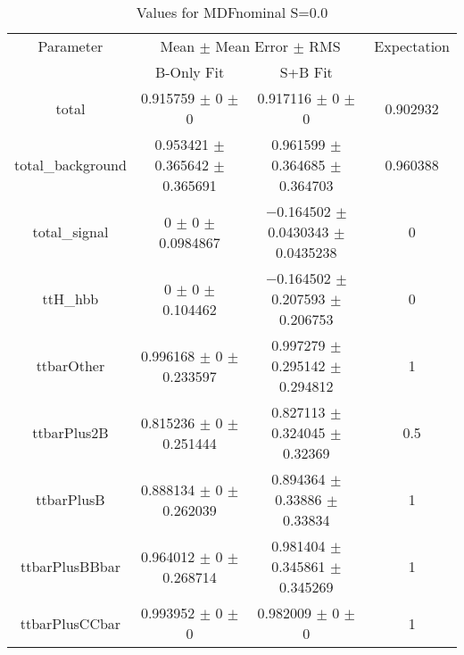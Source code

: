 \begin{table}
\centering
\caption{Values for MDFnominal S=0.0}
\begin{tabular}{cccc}
\toprule
Parameter & \multicolumn{2}{c}{Mean $\pm$ Mean Error $\pm$ RMS} & Expectation\\
 & B-Only Fit & S+B Fit & \\
\midrule
total & \num{0.915759} $\pm$ \num{0} $\pm$ \num{0} & \num{0.917116} $\pm$ \num{0} $\pm$ \num{0} & \num{0.902932}\\
total\_background & \num{0.953421} $\pm$ \num{0.365642} $\pm$ \num{0.365691} & \num{0.961599} $\pm$ \num{0.364685} $\pm$ \num{0.364703} & \num{0.960388}\\
total\_signal & \num{0} $\pm$ \num{0} $\pm$ \num{0.0984867} & \num{-0.164502} $\pm$ \num{0.0430343} $\pm$ \num{0.0435238} & \num{0}\\
ttH\_hbb & \num{0} $\pm$ \num{0} $\pm$ \num{0.104462} & \num{-0.164502} $\pm$ \num{0.207593} $\pm$ \num{0.206753} & \num{0}\\
ttbarOther & \num{0.996168} $\pm$ \num{0} $\pm$ \num{0.233597} & \num{0.997279} $\pm$ \num{0.295142} $\pm$ \num{0.294812} & \num{1}\\
ttbarPlus2B & \num{0.815236} $\pm$ \num{0} $\pm$ \num{0.251444} & \num{0.827113} $\pm$ \num{0.324045} $\pm$ \num{0.32369} & \num{0.5}\\
ttbarPlusB & \num{0.888134} $\pm$ \num{0} $\pm$ \num{0.262039} & \num{0.894364} $\pm$ \num{0.33886} $\pm$ \num{0.33834} & \num{1}\\
ttbarPlusBBbar & \num{0.964012} $\pm$ \num{0} $\pm$ \num{0.268714} & \num{0.981404} $\pm$ \num{0.345861} $\pm$ \num{0.345269} & \num{1}\\
ttbarPlusCCbar & \num{0.993952} $\pm$ \num{0} $\pm$ \num{0} & \num{0.982009} $\pm$ \num{0} $\pm$ \num{0} & \num{1}\\
\bottomrule
\end{tabular}
\end{table}